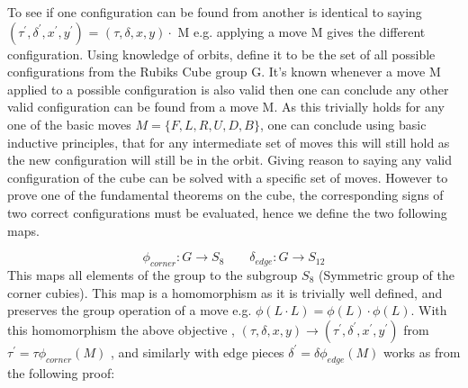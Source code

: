 \documentclass{article}
\newcounter{theo}[section]\setcounter{theo}{0}
\newcounter{lem}[section]\setcounter{lem}{0}
\begin{document}

To see if one configuration can be found from another is identical to saying $(\tau^{'} ,\delta^{'} , x^{'} , y^{'} )$ = $(\tau,\delta, x, y) \cdot$  M e.g. applying a move M gives the different configuration. Using knowledge of orbits, define it to be the set of all possible configurations from the Rubiks Cube group G. It's known whenever a move M applied to a possible configuration is also valid then one can conclude any other valid configuration can be found from a move M. As this trivially holds for any one of the basic moves $M= \{{F,L,R,U,D,B}\}$, one can conclude using basic inductive principles, that for any intermediate set of moves this will still hold as the new configuration will still be in the orbit. Giving reason to saying any valid configuration of the cube can be solved with a specific set of moves. However to prove one of the fundamental theorems on the cube, the corresponding signs of two correct configurations must be evaluated, hence we define the two following maps.


\begin{equation}\label{onto}
\phi_{corner}: G \rightarrow S_{8}\quad \quad 
\delta_{edge}: G \rightarrow S_{12}
\end{equation}
This maps all elements of the group to the subgroup $S_{8}$ (Symmetric group of the corner cubies). This map is a homomorphism as it is trivially well defined, and preserves the group operation of a move e.g. $\phi (L \cdot L) = \phi (L) \cdot \phi(L)$. With this homomorphism the above objective , $(\tau,\delta, x, y) \longrightarrow (\tau^{'},\delta^{'}, x^{'}, y^{'})$ from $\tau^{'} = \tau\phi_{corner}(M) $ , and similarly with edge pieces $\delta^{'} = \delta\phi_{edge}(M) $ works as from the following proof:
\end{document}
